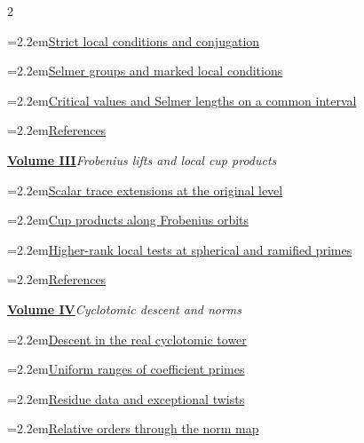 \documentclass[a4paper,11pt]{article}
\theoremstyle{definition}
\theoremstyle{remark}
\numberwithin{equation}{section}
\begin{document}
\begin{multicols}{2}
\begin{minipage}{\linewidth}
\noindent\hangindent=2.2em\hyperref[nav:g-II-0]{Strict local conditions and conjugation}\par
\noindent\hangindent=2.2em\hyperref[nav:selmer-tests]{Selmer groups and marked local conditions}\par
\noindent\hangindent=2.2em\hyperref[nav:selmer-critical]{Critical values and Selmer lengths on a common interval}\par
\noindent\hangindent=2.2em\hyperref[nav:bibliography-II]{References}\par
\end{minipage}\par\medskip
\noindent\begin{minipage}{\linewidth}\raggedright
\textbf{\hyperref[nav:volume-III]{Volume III}}\enspace\emph{Frobenius lifts and local cup products}\par\smallskip
\noindent\hangindent=2.2em\hyperref[nav:trace-extensions]{Scalar trace extensions at the original level}\par
\noindent\hangindent=2.2em\hyperref[nav:frobenius-cups]{Cup products along Frobenius orbits}\par
\noindent\hangindent=2.2em\hyperref[nav:higher-rank-tests]{Higher-rank local tests at spherical and ramified primes}\par
\noindent\hangindent=2.2em\hyperref[nav:bibliography-III]{References}\par
\end{minipage}\par\medskip
\noindent\begin{minipage}{\linewidth}\raggedright
\textbf{\hyperref[nav:volume-IV]{Volume IV}}\enspace\emph{Cyclotomic descent and norms}\par\smallskip
\noindent\hangindent=2.2em\hyperref[nav:g-II-1]{Descent in the real cyclotomic tower}\par
\noindent\hangindent=2.2em\hyperref[nav:g-II-2]{Uniform ranges of coefficient primes}\par
\noindent\hangindent=2.2em\hyperref[nav:g-II-3]{Residue data and exceptional twists}\par
\noindent\hangindent=2.2em\hyperref[nav:g-II-4]{Relative orders through the norm map}\par

\end{minipage}
\end{multicols}
\end{document}
